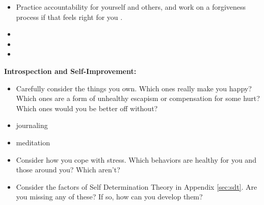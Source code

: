 \documentclass[12pt,letterpaper]{article}
\begin{document}
\begin{itemize}
    \item Practice accountability for yourself and others, and work on a forgiveness process if that feels right for you \cite{mingusAccountability,barnardCommunities,gottmanTrust}.  
    \item {}
    \item {} 
    \item {}
\end{itemize}
\noindent \textbf{Introspection and Self-Improvement:} 
\begin{itemize}
    \item Carefully consider the things you own. Which ones really make you happy? Which ones are a form of unhealthy escapism or compensation for some hurt? Which ones would you be better off without? 
    \item journaling
    \item meditation
    \item Consider how you cope with stress. Which behaviors are healthy for you and those around you? Which aren't?
    \item Consider the factors of Self Determination Theory in Appendix \ref{sec:sdt}. Are you missing any of these? If so, how can you develop them?
\end{itemize}
\end{document}
